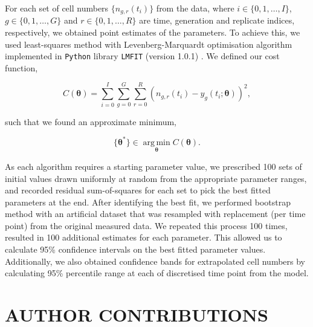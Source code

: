\documentclass[11pt, a4paper]{article}
\begin{document}
For each set of cell numbers $\{n_{g,r}(t_i)\}$ from the data, where $i \in \{0, 1, \dots, I\}$, $g \in \{0, 1, \dots, G\}$ and $r \in \{0,1,\dots,R\}$ are time, generation and replicate indices, respectively, we obtained point estimates of the parameters. 
To achieve this, we used least-squares method with Levenberg-Marquardt \parencite{Marquardt.1963} optimisation algorithm implemented in \verb+Python+ library \verb+LMFIT+ (version 1.0.1) \parencite{Newville.2014}. We defined our cost function, 
\begin{linenomath*}
    \begin{equation*}
        C(\boldsymbol{\theta}) = \sum_{i=0}^I \sum_{g=0}^G \sum_{r=0}^{R} \left( n_{g,r}(t_i) - y_g(t_i; \boldsymbol{\theta}) \right)^2,
    \end{equation*}
\end{linenomath*}
such that we found an approximate minimum,
\begin{linenomath*}
    \begin{equation*}
        \{\boldsymbol{\theta}^*\} \in \operatorname*{arg\,min}_{\boldsymbol{\theta}} C(\boldsymbol{\theta}).
    \end{equation*}
\end{linenomath*}
As each algorithm requires a starting parameter value, we prescribed 100 sets of initial values drawn uniformly at random from the appropriate parameter ranges, and recorded residual sum-of-squares for each set to pick the best fitted parameters at the end. After identifying the best fit, we performed bootstrap method \parencite{Efron.1979} with an artificial dataset that was resampled with replacement (per time point) from the original measured data. We repeated this process 100 times, resulted in 100 additional estimates for each parameter. This allowed us to calculate 95\% confidence intervals on the best fitted parameter values. Additionally, we also obtained confidence bands for extrapolated cell numbers by calculating 95\% percentile range at each of discretised time point from the model.

\nolinenumbers
\section*{AUTHOR CONTRIBUTIONS}
\end{document}
